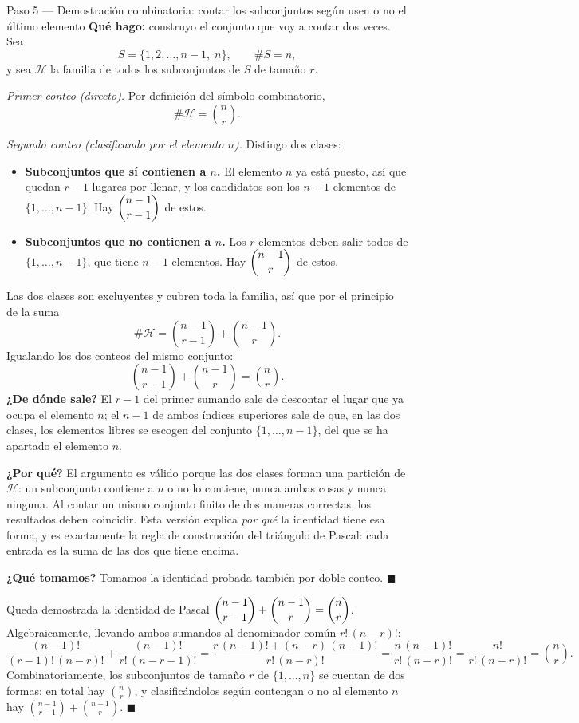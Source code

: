 \documentclass[11pt]{article}
\begin{document}
\begin{sol}
\begin{paso}{Paso 5 --- Demostración combinatoria: contar los subconjuntos según usen o no el último elemento}
\textbf{Qué hago:} construyo el conjunto que voy a contar dos veces. Sea
\[
S=\{1,2,\dots,n-1,\;n\},\qquad \#S=n,
\]
y sea $\mathcal{H}$ la familia de todos los subconjuntos de $S$ de tamaño $r$.

\emph{Primer conteo (directo).} Por definición del símbolo combinatorio,
\[
\#\mathcal{H}=\binom{n}{r}.
\]

\emph{Segundo conteo (clasificando por el elemento $n$).} Distingo dos clases:
\begin{itemize}[leftmargin=*]
  \item \textbf{Subconjuntos que sí contienen a $n$.} El elemento $n$ ya está puesto, así que
        quedan $r-1$ lugares por llenar, y los candidatos son los $n-1$ elementos de
        $\{1,\dots,n-1\}$. Hay $\dbinom{n-1}{r-1}$ de estos.
  \item \textbf{Subconjuntos que no contienen a $n$.} Los $r$ elementos deben salir todos de
        $\{1,\dots,n-1\}$, que tiene $n-1$ elementos. Hay $\dbinom{n-1}{r}$ de estos.
\end{itemize}
Las dos clases son excluyentes y cubren toda la familia, así que por el principio de la suma
\[
\#\mathcal{H}=\binom{n-1}{r-1}+\binom{n-1}{r}.
\]
Igualando los dos conteos del mismo conjunto:
\[
\binom{n-1}{r-1}+\binom{n-1}{r}=\binom{n}{r}.
\]
\textbf{¿De dónde sale?} El $r-1$ del primer sumando sale de descontar el lugar que ya ocupa
el elemento $n$; el $n-1$ de ambos índices superiores sale de que, en las dos clases, los
elementos libres se escogen del conjunto $\{1,\dots,n-1\}$, del que se ha apartado el elemento
$n$.

\textbf{¿Por qué?} El argumento es válido porque las dos clases forman una partición de
$\mathcal{H}$: un subconjunto contiene a $n$ o no lo contiene, nunca ambas cosas y nunca
ninguna. Al contar un mismo conjunto finito de dos maneras correctas, los resultados deben
coincidir. Esta versión explica \emph{por qué} la identidad tiene esa forma, y es exactamente
la regla de construcción del triángulo de Pascal: cada entrada es la suma de las dos que tiene
encima.

\textbf{¿Qué tomamos?} Tomamos la identidad probada también por doble conteo. $\blacksquare$
\end{paso}
\end{sol}

\begin{resp}
Queda demostrada la identidad de Pascal
$\dbinom{n-1}{r-1}+\dbinom{n-1}{r}=\dbinom{n}{r}$. Algebraicamente, llevando ambos sumandos al
denominador común $r!\,(n-r)!$:
\[
\frac{(n-1)!}{(r-1)!\,(n-r)!}+\frac{(n-1)!}{r!\,(n-r-1)!}
=\frac{r\,(n-1)!+(n-r)\,(n-1)!}{r!\,(n-r)!}
=\frac{n\,(n-1)!}{r!\,(n-r)!}=\frac{n!}{r!\,(n-r)!}=\binom{n}{r}.
\]
Combinatoriamente, los subconjuntos de tamaño $r$ de $\{1,\dots,n\}$ se cuentan de dos formas:
en total hay $\binom{n}{r}$, y clasificándolos según contengan o no al elemento $n$ hay
$\binom{n-1}{r-1}+\binom{n-1}{r}$. $\blacksquare$
\end{resp}
\end{document}
